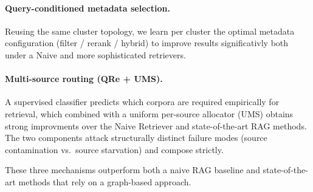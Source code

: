 \paragraph{Query-conditioned metadata selection.} Reusing the
same cluster topology, we learn per cluster the optimal metadata
configuration (filter / rerank / hybrid) to improve results significativly both under a Naive and more sophisticated retrievers.

\paragraph{Multi-source routing (QRe + UMS).} A supervised
classifier predicts which corpora are required empirically for retrieval,
which combined with a uniform per-source allocator (UMS) obtains strong improvments over the Naive Retriever and state-of-the-art RAG methods. The two components attack
structurally distinct failure modes (source contamination vs.\ source starvation) and compose strictly.

These three mechanisms outperform both a naive RAG
baseline and state-of-the-art methods that rely on a graph-based approach.